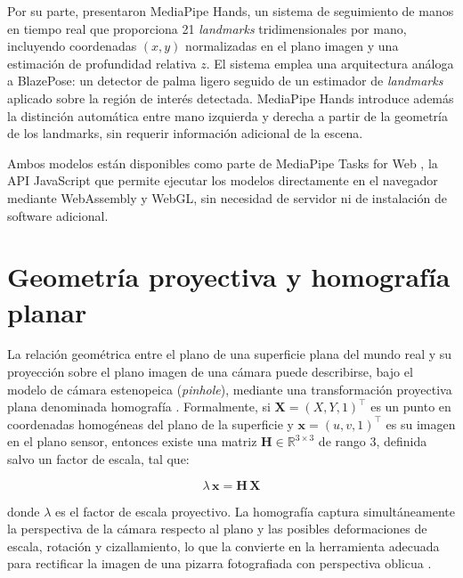 \documentclass[12pt]{report} %
\begin{document}
Por su parte, \citet{zhang2020mediapipe} presentaron MediaPipe Hands, un sistema de seguimiento de manos en tiempo real que proporciona 21 \textit{landmarks} tridimensionales por mano, incluyendo coordenadas $(x, y)$ normalizadas en el plano imagen y una estimación de profundidad relativa $z$. El sistema emplea una arquitectura análoga a BlazePose: un detector de palma ligero seguido de un estimador de \textit{landmarks} aplicado sobre la región de interés detectada. MediaPipe Hands introduce además la distinción automática entre mano izquierda y derecha a partir de la geometría de los landmarks, sin requerir información adicional de la escena.

Ambos modelos están disponibles como parte de MediaPipe Tasks for Web \citep{lugaresi2019mediapipe}, la API JavaScript que permite ejecutar los modelos directamente en el navegador mediante WebAssembly y WebGL, sin necesidad de servidor ni de instalación de software adicional.

\section{Geometría proyectiva y homografía planar}

La relación geométrica entre el plano de una superficie plana del mundo real y su proyección sobre el plano imagen de una cámara puede describirse, bajo el modelo de cámara estenopeica (\textit{pinhole}), mediante una transformación proyectiva plana denominada homografía \citep{hartley2003}. Formalmente, si $\mathbf{X} = (X, Y, 1)^\top$ es un punto en coordenadas homogéneas del plano de la superficie y $\mathbf{x} = (u, v, 1)^\top$ es su imagen en el plano sensor, entonces existe una matriz $\mathbf{H} \in \mathbb{R}^{3 \times 3}$ de rango 3, definida salvo un factor de escala, tal que:

\begin{equation}
  \lambda \, \mathbf{x} = \mathbf{H} \, \mathbf{X}
  \label{eq:homography}
\end{equation}

donde $\lambda$ es el factor de escala proyectivo. La homografía captura simultáneamente la perspectiva de la cámara respecto al plano y las posibles deformaciones de escala, rotación y cizallamiento, lo que la convierte en la herramienta adecuada para rectificar la imagen de una pizarra fotografiada con perspectiva oblicua \citep{szeliski2022}.
\end{document}
